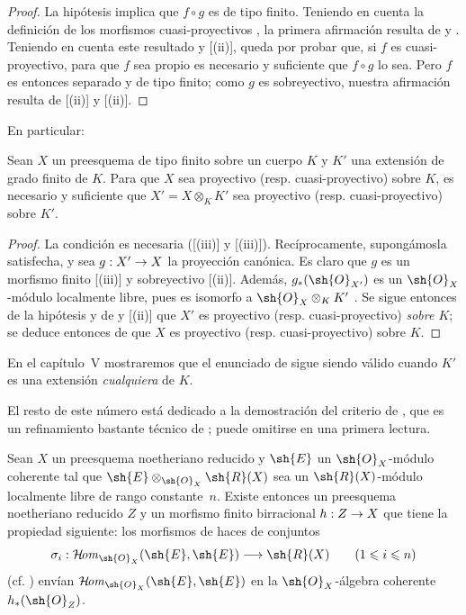 \documentclass[oneside,10pt]{amsart}
\makeatletter
\renewcommand{\leq}{\leqslant}
\newcommand{\ega@arrow}[2]{\mathchoice{#1}{#2}{#2}{#2}}
\renewcommand{\to}{\ega@arrow{\longrightarrow}{\rightarrow}}
\def\shHom{\mathcal{H}\!\mathit{om}}
\let\EGAOriginalLabel\label
\renewcommand{\label}[1]{\phantomsection\EGAOriginalLabel{#1}}
\makeatother
\begin{document}
\begin{proof}
La hipótesis implica que $f\circ g$ es de tipo finito.
Teniendo en cuenta la definición de los morfismos cuasi-proyectivos , la primera afirmación resulta de  y .
Teniendo en cuenta este resultado y [(ii)], queda por probar que, si $f$ es cuasi-proyectivo, para que $f$ sea propio es necesario y suficiente que $f\circ g$ lo sea.
Pero $f$ es entonces separado  y de tipo finito;
como $g$ es sobreyectivo, nuestra afirmación resulta de [(ii)] y [(ii)].
\end{proof}

En particular:

\begin{corollary}[6.6.5]
\label{II.6.6.5}
Sean $X$ un preesquema de tipo finito sobre un cuerpo $K$ y $K'$ una extensión de grado finito de $K$.
Para que $X$ sea proyectivo \textup{(resp.} cuasi-proyectivo\textup{)} sobre $K$, es necesario y suficiente que $X'=X\otimes_K K'$ sea proyectivo \textup{(resp.} cuasi-proyectivo\textup{)} sobre $K'$.
\end{corollary}

\begin{proof}
La condición es necesaria ([(iii)] y [(iii)]).
Recíprocamente, supongámosla satisfecha, y sea $g:X'\to X$ la proyección canónica.
Es claro que $g$ es un morfismo finito [(iii)] y sobreyectivo [(ii)].
Además, $g_*(\sh{O}_{X'})$ es un $\sh{O}_X$-módulo localmente libre, pues es isomorfo a $\sh{O}_X\otimes_K K'$ .
Se sigue entonces de la hipótesis y de  y [(ii)] que $X'$ es proyectivo (resp. cuasi-proyectivo) \emph{sobre $K$};
se deduce entonces de  que $X$ es proyectivo (resp. cuasi-proyectivo) sobre $K$.
\end{proof}

En el capítulo~V mostraremos que el enunciado de  sigue siendo válido cuando $K'$ es una extensión \emph{cualquiera} de $K$.

El resto de este número está dedicado a la demostración del criterio de , que es un refinamiento bastante técnico de ;
puede omitirse en una primera lectura.

\begin{lemma}[6.6.6]
\label{II.6.6.6}
Sean $X$ un preesquema noetheriano reducido y $\sh{E}$ un $\sh{O}_X$-módulo coherente tal que $\sh{E}\otimes_{\sh{O}_X}\sh{R}(X)$ sea un $\sh{R}(X)$-módulo localmente libre de rango constante~$n$.
Existe entonces un preesquema noetheriano reducido $Z$ y un morfismo finito birracional $h:Z\to X$ que tiene la propiedad siguiente: los morfismos de haces de conjuntos
\[
  \sigma_i:\shHom_{\sh{O}_X}(\sh{E},\sh{E})\to\sh{R}(X)
  \qquad\textup{(}1\leq i\leq n\textup{)}
\]
\textup{(cf. )} envían $\shHom_{\sh{O}_X}(\sh{E},\sh{E})$ en la $\sh{O}_X$-álgebra coherente $h_*(\sh{O}_Z)$.
\end{lemma}
\end{document}
